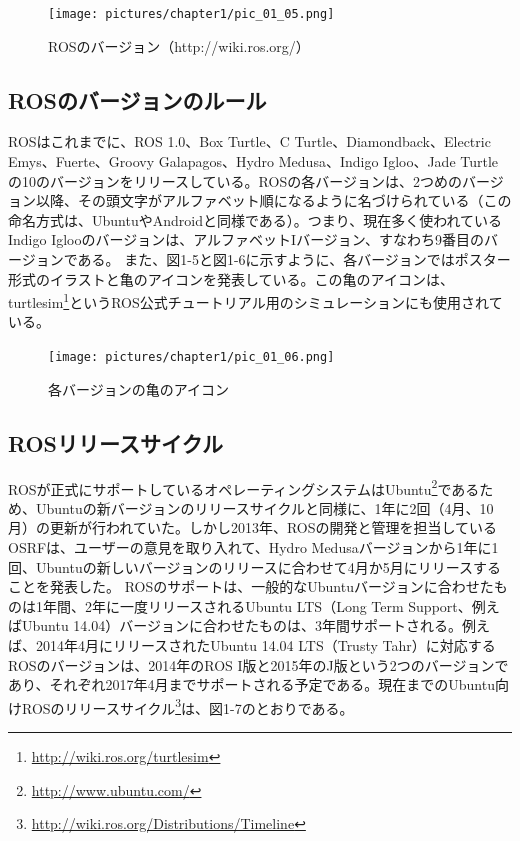 \begin{figure}[h]
  \centering
  \texttt{[image: pictures/chapter1/pic\_01\_05.png]}
  \caption{ROSのバージョン（http://wiki.ros.org/）}
\end{figure}

\subsection{ROSのバージョンのルール}

ROSはこれまでに、ROS 1.0、Box Turtle、C Turtle、Diamondback、Electric Emys、Fuerte、Groovy Galapagos、Hydro Medusa、Indigo Igloo、Jade Turtleの10のバージョンをリリースしている。ROSの各バージョンは、2つめのバージョン以降、その頭文字がアルファベット順になるように名づけられている（この命名方式は、UbuntuやAndroidと同様である）。つまり、現在多く使われているIndigo Iglooのバージョンは、アルファベットIバージョン、すなわち9番目のバージョンである。
また、図1-5と図1-6に示すように、各バージョンではポスター形式のイラストと亀のアイコンを発表している。この亀のアイコンは、turtlesim\footnote{\url{http://wiki.ros.org/turtlesim}}というROS公式チュートリアル用のシミュレーションにも使用されている。

\begin{figure}[h]
  \centering
  \texttt{[image: pictures/chapter1/pic\_01\_06.png]}
  \caption{各バージョンの亀のアイコン}
\end{figure}

\subsection{ROSリリースサイクル}

ROSが正式にサポートしているオペレーティングシステムはUbuntu\footnote{\url{http://www.ubuntu.com/}}であるため、Ubuntuの新バージョンのリリースサイクルと同様に、1年に2回（4月、10月）の更新が行われていた。しかし2013年、ROSの開発と管理を担当しているOSRFは、ユーザーの意見を取り入れて、Hydro Medusaバージョンから1年に1回、Ubuntuの新しいバージョンのリリースに合わせて4月か5月にリリースすることを発表した。
ROSのサポートは、一般的なUbuntuバージョンに合わせたものは1年間、2年に一度リリースされるUbuntu LTS（Long Term Support、例えばUbuntu 14.04）バージョンに合わせたものは、3年間サポートされる。例えば、2014年4月にリリースされたUbuntu 14.04 LTS（Trusty Tahr）に対応するROSのバージョンは、2014年のROS I版と2015年のJ版という2つのバージョンであり、それぞれ2017年4月までサポートされる予定である。現在までのUbuntu向けROSのリリースサイクル\footnote{\url{http://wiki.ros.org/Distributions/Timeline}}は、図1-7のとおりである。\\

